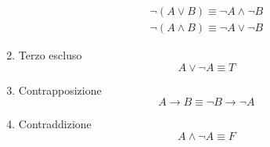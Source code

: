 \begin{enumerate}
\begin{align*}
                \neg (A \lor B)  \equiv  \neg A \land \neg B \\
                \neg(A \land B)  \equiv  \neg A \lor \neg B
            \end{align*}
    \item Terzo escluso
            \begin{equation*}
                A \lor \neg A \equiv T
            \end{equation*}
    \item Contrapposizione
            \begin{equation*}
                A \rightarrow B \equiv \neg B \rightarrow \neg A
            \end{equation*}
    \item Contraddizione
            \begin{equation*}
                A \land \neg A \equiv F
            \end{equation*}
\end{enumerate}

